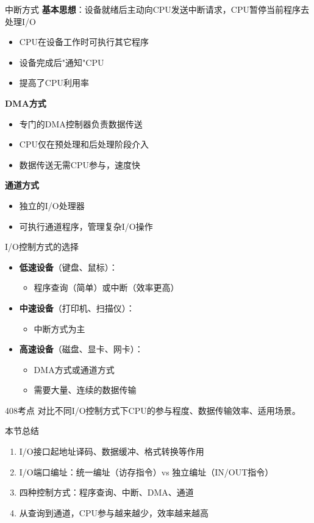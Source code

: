 \documentclass[10pt, aspectratio=169]{beamer}
\begin{document}
\begin{frame}{中断方式}
    \textbf{基本思想}：设备就绪后主动向CPU发送中断请求，CPU暂停当前程序去处理I/O
    \vspace{0.3em}
    \begin{itemize}
        \item CPU在设备工作时可执行其它程序
        \item 设备完成后"通知"CPU
        \item 提高了CPU利用率
    \end{itemize}
    \vspace{0.5em}
    \textbf{DMA方式}
    \begin{itemize}
        \item 专门的DMA控制器负责数据传送
        \item CPU仅在预处理和后处理阶段介入
        \item 数据传送无需CPU参与，速度快
    \end{itemize}
    \vspace{0.5em}
    \textbf{通道方式}
    \begin{itemize}
        \item 独立的I/O处理器
        \item 可执行通道程序，管理复杂I/O操作
    \end{itemize}
\end{frame}

\begin{frame}{I/O控制方式的选择}
    \begin{itemize}
        \item \textbf{低速设备}（键盘、鼠标）：
            \begin{itemize}
                \item 程序查询（简单）或中断（效率更高）
            \end{itemize}
        \item \textbf{中速设备}（打印机、扫描仪）：
            \begin{itemize}
                \item 中断方式为主
            \end{itemize}
        \item \textbf{高速设备}（磁盘、显卡、网卡）：
            \begin{itemize}
                \item DMA方式或通道方式
                \item 需要大量、连续的数据传输
            \end{itemize}
    \end{itemize}
    \vspace{0.5em}
    \begin{block}{408考点}
        对比不同I/O控制方式下CPU的参与程度、数据传输效率、适用场景。
    \end{block}
\end{frame}

\begin{frame}{本节总结}
    \begin{enumerate}
        \item I/O接口起地址译码、数据缓冲、格式转换等作用
        \item I/O端口编址：统一编址（访存指令）vs 独立编址（IN/OUT指令）
        \item 四种控制方式：程序查询、中断、DMA、通道
        \item 从查询到通道，CPU参与越来越少，效率越来越高
    \end{enumerate}
\end{frame}
\end{document}
